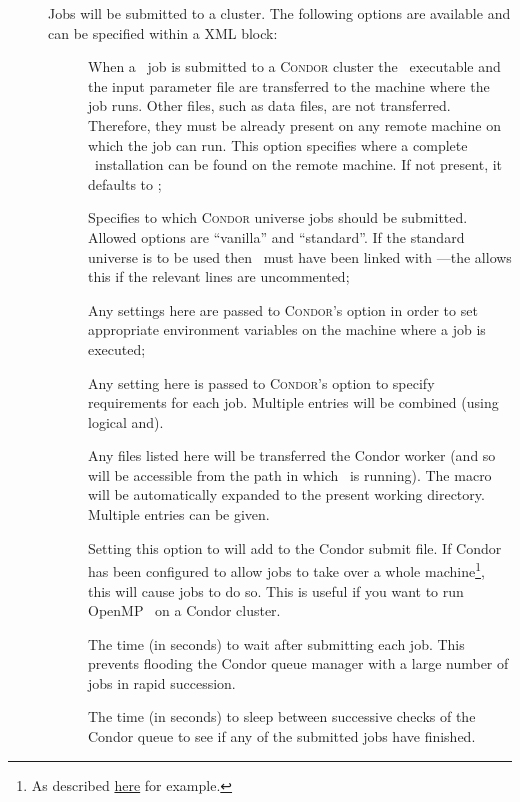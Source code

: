 \begin{description}
\item[] Jobs will be submitted to a  cluster. The following options are available and can be specified within a  XML block:
\begin{description}
\item[] When a \glc\ job is submitted to a {\normalfont \scshape Condor} cluster the \glc\ executable and the input parameter file are transferred to the machine where the job runs. Other files, such as data files, are not transferred. Therefore, they must be already present on any remote machine on which the job can run. This option specifies where a complete \glc\ installation can be found on the remote machine. If not present, it defaults to ;
\item[] Specifies to which {\normalfont \scshape Condor} universe jobs should be submitted. Allowed options are ``vanilla'' and ``standard''. If the standard universe is to be used then \glc\ must have been linked with ---the  allows this if the relevant lines are uncommented;
\item[] Any settings here are passed to {\normalfont \scshape Condor}'s  option in order to set appropriate environment variables on the machine where a job is executed;
\item[] Any setting here is passed to {\normalfont \scshape Condor}'s  option to specify requirements for each job. Multiple  entries will be combined (using logical and).
\item[] Any files listed here will be transferred the Condor worker (and so will be accessible from the path in which \glc\ is running). The macro  will be automatically expanded to the present working directory. Multiple  entries can be given.
\item [] Setting this option to  will add  to the Condor submit file. If Condor has been configured to allow jobs to take over a whole machine\footnote{As described \protect\href{https://www-auth.cs.wisc.edu/lists/condor-users/2009-January/msg00086.shtml}{here} for example.}, this will cause jobs to do so. This is useful if you want to run OpenMP \glc\ on a Condor cluster.
\item[] The time (in seconds) to wait after submitting each job. This prevents flooding the Condor queue manager with a large number of jobs in rapid succession.
\item[] The time (in seconds) to sleep between successive checks of the Condor queue to see if any of the submitted jobs have finished.
\end{description}

\end{description}

